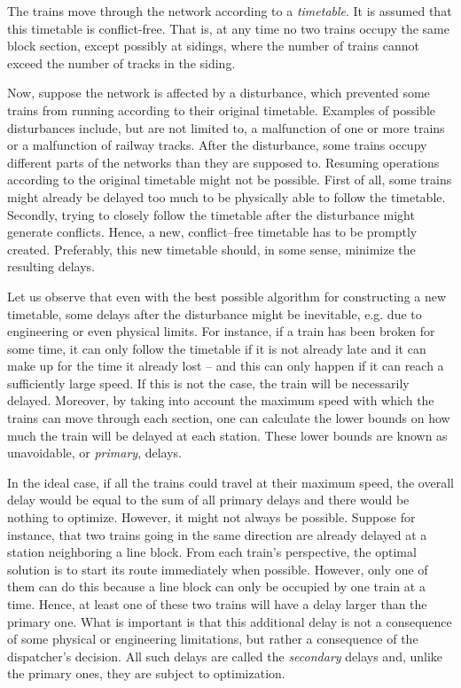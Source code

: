 The trains move through the network according to a \emph{timetable}. It is assumed that this
timetable is conflict-free. That is, at any time no two trains occupy the same block section, except
possibly at sidings, where the number of trains cannot exceed the number of tracks in the siding.

Now, suppose the network is affected by a disturbance, which prevented some trains from running
according to their original timetable. Examples of possible disturbances include, but are not
limited to, a malfunction of one or more trains or a malfunction of railway tracks. After the
disturbance, some trains occupy different parts of the networks than they are supposed to.
Resuming operations according to the original timetable might not be
possible. First of all, some trains might already be delayed too much to be physically able to
follow the timetable. Secondly, trying to closely follow the timetable after the disturbance
might generate conflicts. Hence, a new, conflict--free timetable has to be promptly created.
Preferably, this new timetable should, in some sense, minimize the resulting delays.


Let us observe that even with the best possible algorithm for constructing a new timetable, some
delays after the disturbance might be inevitable, e.g. due to engineering or even physical limits.
For instance, if a train has been broken for some time, it can only follow the timetable if it
is not already late and it can make up for the time it already lost -- and this can only happen
if it can reach a sufficiently large speed. If this is not the case, the train will be necessarily
delayed. Moreover, by taking into account the maximum speed with which the trains can move
through each section, one can calculate the lower bounds on how much the train will be delayed
at each station. These lower bounds are known as unavoidable, or \emph{primary}, delays.

In the ideal case, if all the trains could travel at their maximum speed, the overall delay
would be equal to the sum of all primary delays and there would be nothing to optimize. However,
it might not always be possible. Suppose for instance, that two trains going in the same
direction are already delayed at a station neighboring a line block. From each train's perspective,
the optimal solution is to start its route immediately when possible. However, only one of them
can do this because a line block can only be occupied by one train at a time. Hence, at least
one of these two trains will have a delay larger than the primary one. What is important is that
this additional delay is not a consequence of some physical or engineering limitations, but rather
a consequence of the dispatcher's decision. All such delays are called the \emph{secondary} delays
and, unlike the primary ones, they are subject to optimization.


